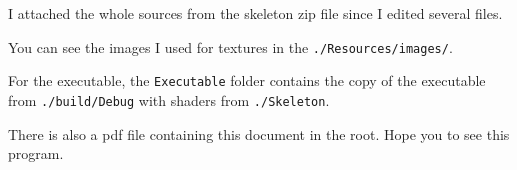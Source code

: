 \documentclass[11pt]{article}
\begin{document}
I attached the whole sources from the skeleton zip file since I edited several files.

You can see the images I used for textures in the \texttt{./Resources/images/}.

For the executable, the \texttt{Executable} folder contains the copy of the executable from \texttt{./build/Debug} with shaders from \texttt{./Skeleton}.

There is also a pdf file containing this document in the root. Hope you to see this program.






\end{document}
